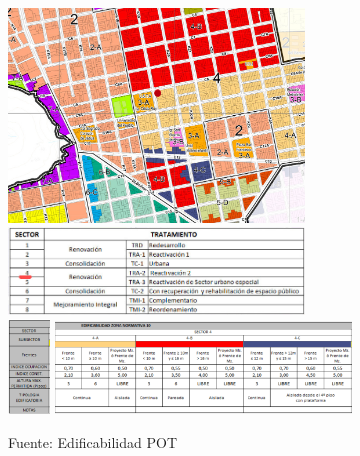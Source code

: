 \documentclass[12pt,a4paper,twoside]{article}
\begin{document}
\begin{figure}[!h]
	\centering
	\includegraphics[width=0.7\textwidth]{Norma/Edificabilidad}
	\includegraphics[width=0.7\textwidth]{Norma/Edificabilidad1}\\	\includegraphics[width=0.1\textwidth]{Norma/Edificabilidad3}
	\includegraphics[width=0.7\textwidth]{Norma/Edificabilidad2}\\
	\caption{Fuente: Edificabilidad POT}
	\label{fig:tratamiento}
\end{figure}
\end{document}
